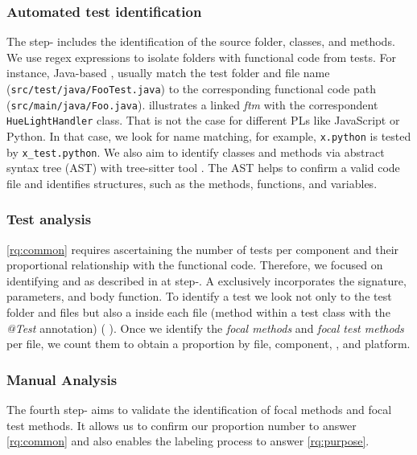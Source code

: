 \subsubsection{Automated test identification}
The step- includes the identification of the source folder, classes, and methods. We use regex expressions to isolate folders with functional code from tests. For instance, Java-based \addons, usually match the test folder and file name (\eg \texttt{src/test/java/FooTest.java}) to the corresponding functional code path (\eg \texttt{src/main/java/Foo.java}).  illustrates a linked \textit{ftm} with the correspondent \fm \texttt{HueLightHandler} class. That is not the case for different PLs like JavaScript or Python. In that case, we look for name matching, for example,  \texttt{x.python} is tested by \texttt{x\_test.python}. We also aim to identify classes and methods via abstract syntax tree (AST) with tree-sitter tool \cite{noauthor_tree-sitterintroduction_nodate}. The AST helps to confirm a valid code file and identifies structures, such as the methods, functions, and variables. 
\subsubsection{Test analysis}
\ref{rq:common} requires ascertaining the number of tests per component and their proportional relationship with the functional code. Therefore, we focused on identifying \fm and \ftm as described in  at step-. A \fm exclusively incorporates the signature, parameters, and body function. To identify a test we look not only to the test folder and files but also a \ftm inside each file (\ie method within a test class with the \textit{@Test} annotation) ( ). Once we identify the \textit{focal methods} and \textit{focal test methods} per file, we count them to obtain a proportion by file, component, \addon, and platform. 








\subsubsection{Manual Analysis}

The fourth step- aims to validate the identification of focal methods and focal test methods. It allows us to confirm our proportion number to answer \ref{rq:common} and also enables the labeling process to answer \ref{rq:purpose}.


